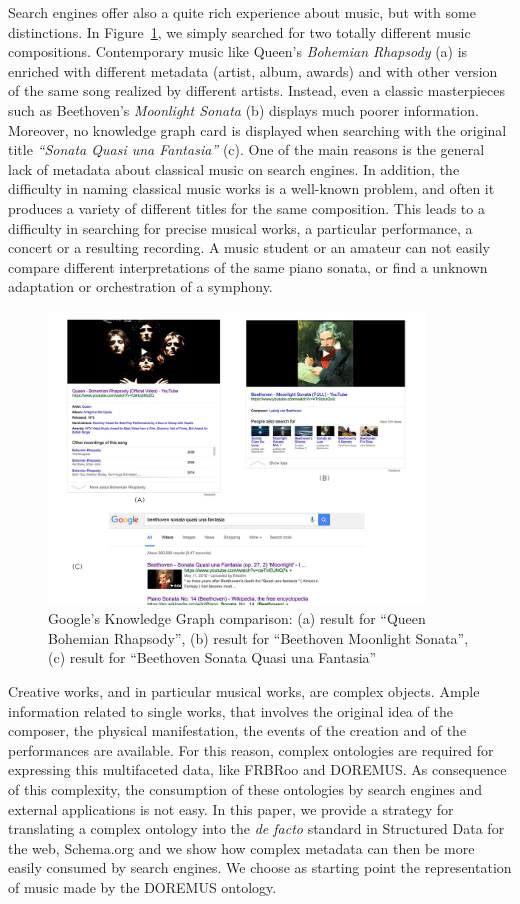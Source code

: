 \documentclass{llncs}
\begin{document}
Search engines offer also a quite rich experience about music, but with some distinctions. In Figure~\ref{fig:knowledge-graph}, we simply searched for two totally different music compositions. Contemporary music like Queen's \textit{Bohemian Rhapsody} (a) is enriched with different metadata (artist, album, awards) and with other version of the same song realized by different artists. Instead, even a classic masterpieces such as Beethoven's \textit{Moonlight Sonata} (b) displays much poorer information. Moreover, no knowledge graph card is displayed when searching with the original title \textit{``Sonata Quasi una Fantasia''} (c). One of the main reasons is the general lack of metadata about classical music on search engines. In addition, the difficulty in naming classical music works is a well-known problem, and often it produces a variety of different titles for the same composition. This leads to a difficulty in searching for precise musical works, a particular performance, a concert or a resulting recording. A music student or an amateur can not easily compare different interpretations of the same piano sonata, or find a unknown adaptation or orchestration of a symphony.

\begin{figure}
\includegraphics[width=10cm]{img/knowledge-graph.jpg}
\centering
\caption{Google's Knowledge Graph comparison: (a) result for ``Queen Bohemian Rhapsody'', (b) result for ``Beethoven Moonlight Sonata'', (c) result for ``Beethoven Sonata Quasi una Fantasia''}
\label{fig:knowledge-graph}
\end{figure}

Creative works, and in particular musical works, are complex objects. Ample information related to single works, that involves the original idea of the composer, the physical manifestation, the events of the creation and of the performances are available. For this reason, complex ontologies are required for expressing this multifaceted data, like FRBRoo and DOREMUS. As consequence of this complexity, the consumption of these ontologies by search engines and external applications is not easy. In this paper, we provide a strategy for translating a complex ontology into the \textit{de facto} standard in Structured Data for the web, Schema.org and we show how complex metadata can then be more easily consumed by search engines. We choose as starting point the representation of music made by the DOREMUS ontology.
\end{document}
